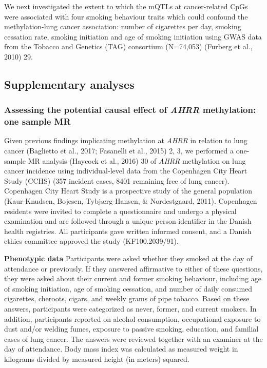 \documentclass[11pt,twoside]{bristolthesis}
\begin{document}
We next investigated the extent to which the mQTLs at cancer-related CpGs were associated with four smoking behaviour traits which could confound the methylation-lung cancer association: number of cigarettes per day, smoking cessation rate, smoking initiation and age of smoking initiation using GWAS data from the Tobacco and Genetics (TAG) consortium (N=74,053) (Furberg et al., 2010) 29.

\hypertarget{supplementary-analyses}{%
\subsection{Supplementary analyses}\label{supplementary-analyses}}

\hypertarget{assessing-the-potential-causal-effect-of-ahrr-methylation-one-sample-mr}{%
\subsubsection{\texorpdfstring{Assessing the potential causal effect of \emph{AHRR} methylation: one sample MR}{Assessing the potential causal effect of AHRR methylation: one sample MR}}\label{assessing-the-potential-causal-effect-of-ahrr-methylation-one-sample-mr}}

Given previous findings implicating methylation at \emph{AHRR} in relation to lung cancer (Baglietto et al., 2017; Fasanelli et al., 2015) 2, 3, we performed a one-sample MR analysis (Haycock et al., 2016) 30 of \emph{AHRR} methylation on lung cancer incidence using individual-level data from the Copenhagen City Heart Study (CCHS) (357 incident cases, 8401 remaining free of lung cancer). Copenhagen City Heart Study is a prospective study of the general population (Kaur-Knudsen, Bojesen, Tybjærg-Hansen, \& Nordestgaard, 2011). Copenhagen residents were invited to complete a questionnaire and undergo a physical examination and are followed through a unique person identifier in the Danish health registries. All participants gave written informed consent, and a Danish ethics committee approved the study (KF100.2039/91).

\textbf{Phenotypic data}
Participants were asked whether they smoked at the day of attendance or previously. If they answered affirmative to either of these questions, they were asked about their current and former smoking behaviour, including age of smoking initiation, age of smoking cessation, and number of daily consumed cigarettes, cheroots, cigars, and weekly grams of pipe tobacco. Based on these answers, participants were categorized as never, former, and current smokers. In addition, participants reported on alcohol consumption, occupational exposure to dust and/or welding fumes, exposure to passive smoking, education, and familial cases of lung cancer. The answers were reviewed together with an examiner at the day of attendance. Body mass index was calculated as measured weight in kilograms divided by measured height (in meters) squared.
\end{document}
